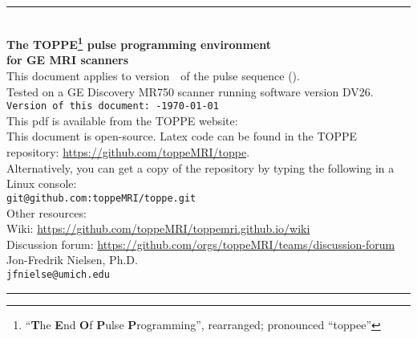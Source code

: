 

\begin{titlepage}
~\\[0.5in]
\begin{centering}
\rule{\textwidth}{5pt}
~\\[0.5in]
{\bf \huge The TOPPE\footnote{``\textbf{T}he \textbf{E}nd \textbf{O}f \textbf{P}ulse \textbf{P}rogramming'', rearranged; pronounced ``toppee''} pulse programming environment} \\ [0.4in]
{\bf \huge for GE MRI scanners} \\ [0.6in]
{This document applies to version~\toppeversion~of the pulse sequence (\toppe).   } \\ [0.1in]
{Tested on a GE Discovery MR750 scanner running software version DV26.   } \\ [0.3in]
{\tt Version of this document:~\toppeversion-\today} \\ [0.3in]
This pdf is available from the TOPPE website: \toppeweb \\ [0.2in]
This document is open-source. Latex code can be found in the TOPPE repository: \url{https://github.com/toppeMRI/toppe}. \\
Alternatively, you can get a copy of the repository by typing the following in a Linux console:\\
{\tt git@github.com:toppeMRI/toppe.git} \\ [0.2in]
{Other resources:} \\
{Wiki: \url{https://github.com/toppeMRI/toppemri.github.io/wiki}} \\
{Discussion forum: \url{https://github.com/orgs/toppeMRI/teams/discussion-forum} } \\ [0.3in]
{Jon-Fredrik Nielsen, Ph.D.} \\
{\tt jfnielse@umich.edu} \\ [0.5in]
\rule{\textwidth}{5pt}
\end{centering}
\end{titlepage}


